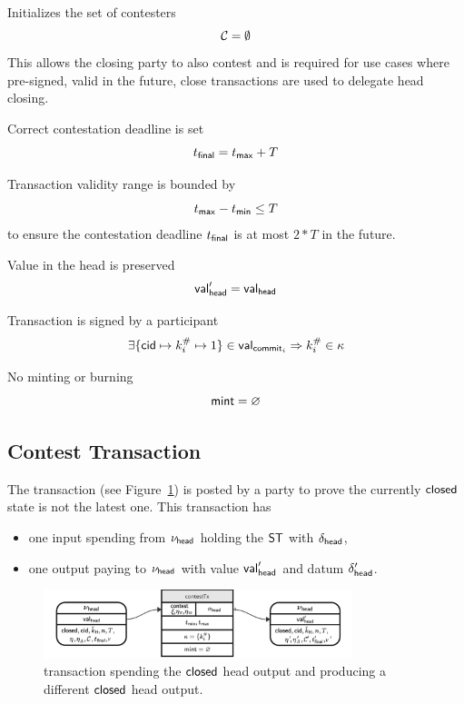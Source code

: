 \begin{menumerate}
	\item Initializes the set of contesters
	\[
		\mathcal{C} = \emptyset
	\]
	This allows the closing party to also contest and is required for use
	cases where pre-signed, valid in the future, close transactions are
	used to delegate head closing.

	\item Correct contestation deadline is set
	\[
		t_{\mathsf{final}} = t_{\mathsf{max}} + T
	\]
	\item Transaction validity range is bounded by
	\[
		t_{\mathsf{max}} - t_{\mathsf{min}} \leq T
	\]
	to ensure the contestation deadline $t_{\mathsf{final}}$ is at most $2*T$ in the future.
	\item Value in the head is preserved
	\[
		\mathsf{val}_{\mathsf{head}}' = \mathsf{val}_{\mathsf{head}}
	\]
	\item Transaction is signed by a participant
	\[
		\exists \{\mathsf{cid} \mapsto k^{\#}_{i} \mapsto 1\} \in \mathsf{val}_{\mathsf{commit}_{i}} \Rightarrow k^{\#}_{i} \in \kappa
	\]
	\item No minting or burning
	\[
		\mathsf{mint} = \varnothing
	\]
\end{menumerate}

\subsection{Contest Transaction}\label{sec:contest-tx}

The \mtxContest{} transaction (see Figure~\ref{fig:contestTx}) is posted by a
party to prove the currently $\mathsf{closed}$ state is not the latest one. This
transaction has
\begin{itemize}
	\item one input spending from $\nu_\mathsf{head}$ holding the $\mathsf{ST}$ with $\delta_{\mathsf{head}}$,
	\item one output paying to $\nu_\mathsf{head}$ with value $\mathsf{val}_{\mathsf{head}}'$ and
	      datum $\delta_{\mathsf{head}}'$.
\end{itemize}

\begin{figure}
	\centering \includegraphics[width=0.8\textwidth]{figures/contestTx.pdf}
	\caption{\mtxContest{} transaction spending the $\mathsf{closed}$ head output and
		producing a different $\mathsf{closed}$ head output.}\label{fig:contestTx}
\end{figure}

